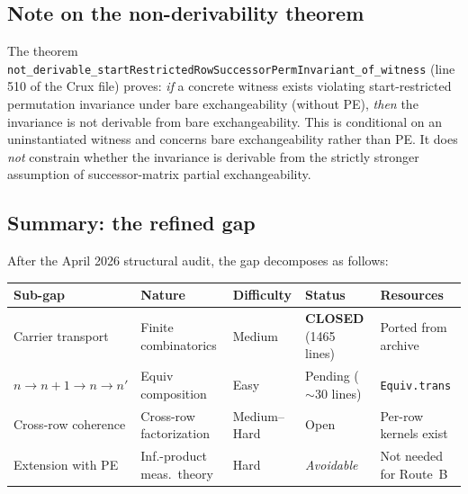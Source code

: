 \documentclass[11pt]{article}
\theoremstyle{definition}
\newcommand{\lean}[1]{\texttt{#1}}
\begin{document}
\subsection{Note on the non-derivability theorem}

The theorem \lean{not\_derivable\_startRestrictedRowSuccessorPermInvariant\_of\_witness}
(line 510 of the Crux file) proves: \emph{if} a concrete witness
exists violating start-restricted permutation invariance under bare
exchangeability (without PE), \emph{then} the invariance is not
derivable from bare exchangeability.  This is conditional on an
uninstantiated witness and concerns bare exchangeability rather than PE.
It does \emph{not} constrain whether the invariance is derivable from
the strictly stronger assumption of successor-matrix partial
exchangeability.

\subsection{Summary: the refined gap}

After the April 2026 structural audit, the gap decomposes as follows:

\begin{center}
\small
\begin{tabular}{lllll}
\hline
\textbf{Sub-gap} & \textbf{Nature} & \textbf{Difficulty} & \textbf{Status} & \textbf{Resources} \\
\hline
Carrier transport & Finite combinatorics & Medium & {\color{provedgreen}\textbf{CLOSED}} (1465 lines) & Ported from archive \\
$n{\to}n{+}1 \to n{\to}n'$ & Equiv composition & Easy & Pending ($\sim$30 lines) & \lean{Equiv.trans} \\
Cross-row coherence & Cross-row factorization & Medium--Hard & Open & Per-row kernels exist \\
Extension with PE & Inf.-product meas.\ theory & Hard & \emph{Avoidable} & Not needed for Route~B \\
\hline
\end{tabular}
\end{center}
\end{document}
